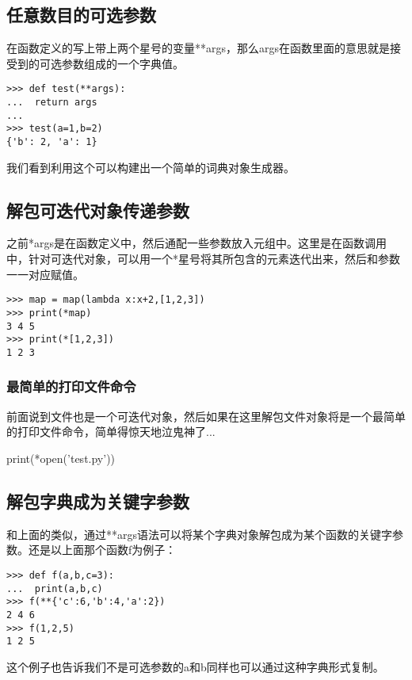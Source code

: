 \documentclass[12pt,oneside]{book}
\begin{document}
\begin{common-format}
\subsection{任意数目的可选参数}
在函数定义的写上带上两个星号的变量**args，那么args在函数里面的意思就是接受到的可选参数组成的一个字典值。
\begin{Verbatim}
>>> def test(**args):
...  return args
... 
>>> test(a=1,b=2)
{'b': 2, 'a': 1}
\end{Verbatim}

我们看到利用这个可以构建出一个简单的词典对象生成器。

\subsection{解包可迭代对象传递参数}
之前*args是在函数定义中，然后通配一些参数放入元组中。这里是在函数调用中，针对可迭代对象，可以用一个*星号将其所包含的元素迭代出来，然后和参数一一对应赋值。
\begin{Verbatim}
>>> map = map(lambda x:x+2,[1,2,3])
>>> print(*map)
3 4 5
>>> print(*[1,2,3])
1 2 3
\end{Verbatim}

\subsubsection{最简单的打印文件命令}
前面说到文件也是一个可迭代对象，然后如果在这里解包文件对象将是一个最简单的打印文件命令，简单得惊天地泣鬼神了...
\begin{tcbpython}[]
print(*open('test.py'))
\end{tcbpython}



\subsection{解包字典成为关键字参数}
和上面的类似，通过**args语法可以将某个字典对象解包成为某个函数的关键字参数。还是以上面那个函数f为例子：
\begin{Verbatim}
>>> def f(a,b,c=3):
...  print(a,b,c)
>>> f(**{'c':6,'b':4,'a':2})
2 4 6
>>> f(1,2,5)
1 2 5
\end{Verbatim}

这个例子也告诉我们不是可选参数的a和b同样也可以通过这种字典形式复制。



\end{common-format}
\end{document}
